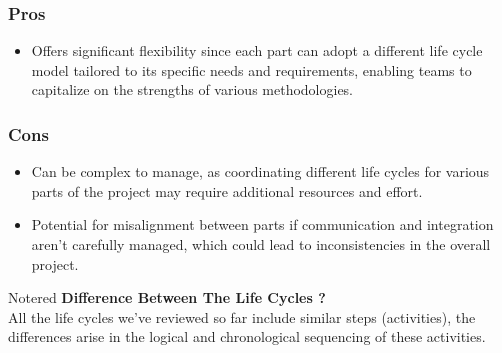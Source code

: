 \subsubsection{Pros}
\begin{itemize} 
\item Offers significant flexibility since each part can adopt a different life cycle model tailored to its specific needs
and requirements, enabling teams to capitalize on the strengths of various methodologies.
\end{itemize}
\subsubsection{Cons}
\begin{itemize}
\item Can be complex to manage, as coordinating different life cycles for various parts of the project may require additional
resources and effort.
\item Potential for misalignment between parts if communication and integration aren’t carefully managed, which could lead
to inconsistencies in the overall project.
\end{itemize}

\vspace{1cm}
\begin{prettyBox}{Note}{red}
    \textbf{Difference Between The Life Cycles ?}\\
All the life cycles we've reviewed so far include similar steps (activities), the differences arise in the logical and
chronological sequencing of these activities.
\end{prettyBox}

